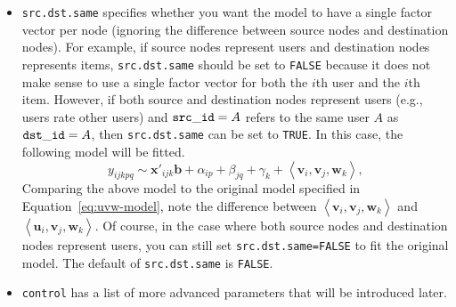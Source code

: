 \begin{itemize}
\item {\tt src.dst.same} specifies whether you want the model to have a single factor vector per node (ignoring the difference between source nodes and destination nodes).  For example, if source nodes represent users and destination nodes represents items, {\tt src.dst.same} should be set to {\tt FALSE} because it does not make sense to use a single factor vector for both the $i$th user and the $i$th item.  However, if both source and destination nodes represent users (e.g., users rate other users) and ${\tt src\_id} = A$ refers to the same user $A$ as ${\tt dst\_id} = A$, then {\tt src.dst.same} can be set to {\tt TRUE}.  In this case, the following model will be fitted.
\begin{equation}
y_{ijkpq} \sim \bm{x}'_{ijk} \bm{b} + \alpha_{ip} + \beta_{jq} + \gamma_{k} + \left<\bm{v}_i, \bm{v}_j, \bm{w}_k\right>, \label{eq:vvw-model}
\end{equation}
Comparing the above model to the original model specified in Equation~\ref{eq:uvw-model}, note the difference between $\left<\bm{v}_i, \bm{v}_j, \bm{w}_k\right>$ and
$\left<\bm{u}_i, \bm{v}_j, \bm{w}_k\right>$.  Of course, in the case where both source nodes and destination nodes represent users, you can still set {\tt src.dst.same=FALSE} to fit the original model.  The default of {\tt src.dst.same} is {\tt FALSE}.
\item {\tt control} has a list of more advanced parameters that will be introduced later.
\end{itemize}


